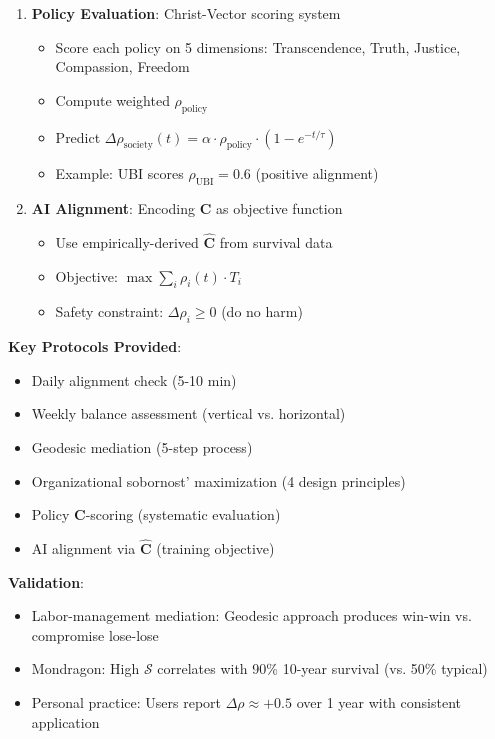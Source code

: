 \documentclass[11pt,a4paper]{article}
\theoremstyle{definition}
\theoremstyle{remark}
\begin{document}
\begin{small}
\begin{enumerate}
\begin{mdframed}[backgroundcolor=green!10,linewidth=2pt,linecolor=green!70!black]
\begin{enumerate}[nosep]
    \item \textbf{Policy Evaluation}: Christ-Vector scoring system
        \begin{itemize}[nosep]
            \item Score each policy on 5 dimensions: Transcendence, Truth, Justice, Compassion, Freedom
            \item Compute weighted \(\rho_{\text{policy}}\)
            \item Predict \(\Delta\rho_{\text{society}}(t) = \alpha \cdot \rho_{\text{policy}} \cdot (1-e^{-t/\tau})\)
            \item Example: UBI scores \(\rho_{\text{UBI}} = 0.6\) (positive alignment)
        \end{itemize}
    
    \item \textbf{AI Alignment}: Encoding \(\mathbf{C}\) as objective function
        \begin{itemize}[nosep]
            \item Use empirically-derived \(\hat{\mathbf{C}}\) from survival data
            \item Objective: \(\max \sum_i \rho_i(t) \cdot T_i\)
            \item Safety constraint: \(\Delta\rho_i \geq 0\) (do no harm)
        \end{itemize}
\end{enumerate}

\textbf{Key Protocols Provided}:
\begin{itemize}[nosep]
    \item Daily alignment check (5-10 min)
    \item Weekly balance assessment (vertical vs. horizontal)
    \item Geodesic mediation (5-step process)
    \item Organizational sobornost' maximization (4 design principles)
    \item Policy \(\mathbf{C}\)-scoring (systematic evaluation)
    \item AI alignment via \(\hat{\mathbf{C}}\) (training objective)
\end{itemize}

\textbf{Validation}:
\begin{itemize}[nosep]
    \item Labor-management mediation: Geodesic approach produces win-win vs. compromise lose-lose
    \item Mondragon: High \(\mathcal{S}\) correlates with 90\% 10-year survival (vs. 50\% typical)
    \item Personal practice: Users report \(\Delta\rho \approx +0.5\) over 1 year with consistent application
\end{itemize}


\end{mdframed}
\end{enumerate}
\end{small}
\end{document}
